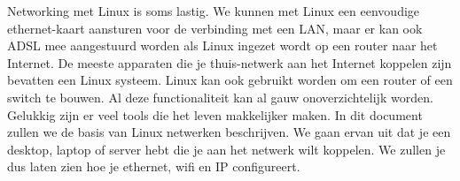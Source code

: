 Networking met Linux is soms lastig. We kunnen met Linux een eenvoudige ethernet-kaart aansturen voor de verbinding met een LAN, maar er kan ook ADSL mee aangestuurd worden als Linux ingezet wordt op een router naar het Internet. De meeste apparaten die je thuis-netwerk aan het Internet koppelen zijn bevatten een Linux systeem. Linux kan ook gebruikt worden om een router of een switch te bouwen. Al deze functionaliteit kan al gauw onoverzichtelijk worden. Gelukkig zijn er veel tools die het leven makkelijker maken. In dit document zullen we de basis van Linux netwerken beschrijven. We gaan ervan uit dat je een desktop, laptop of server hebt die je aan het netwerk wilt koppelen. We zullen je dus laten zien hoe je ethernet, wifi en IP configureert.


